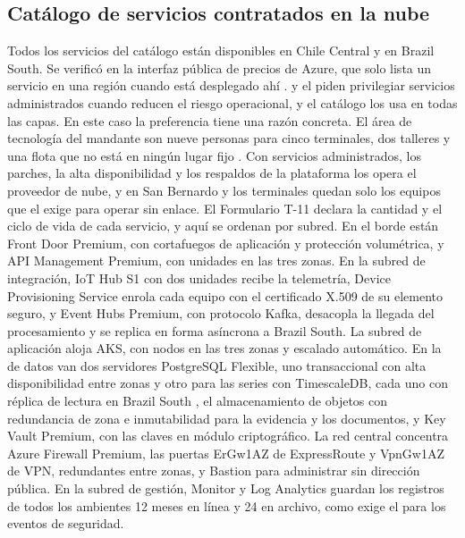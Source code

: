 \subsection{Catálogo de servicios contratados en la nube}\label{sec:4-catalogo}

Todos los servicios del catálogo están disponibles en Chile Central y en Brazil South. Se verificó en
la interfaz pública de precios de Azure, que solo lista un servicio en una región cuando está
desplegado ahí \parencite{ms_precios_api}.  y el  piden privilegiar
servicios administrados cuando reducen el riesgo operacional, y el catálogo los usa en todas las capas.
En este caso la preferencia tiene una razón concreta. El área de tecnología del mandante son nueve
personas para cinco terminales, dos talleres y una flota que no está en ningún lugar fijo
. Con servicios administrados, los parches, la alta disponibilidad y los
respaldos de la plataforma los opera el proveedor de nube, y en San Bernardo y los terminales quedan
solo los equipos que el  exige para operar sin enlace. El Formulario T-11 declara
la cantidad y el ciclo de vida de cada servicio, y aquí se ordenan por subred. En el borde están Front
Door Premium, con cortafuegos de aplicación y protección volumétrica, y API Management Premium, con
unidades en las tres zonas. En la subred de integración, IoT Hub S1 con dos unidades recibe la
telemetría, Device Provisioning Service enrola cada equipo con el certificado X.509 de su elemento
seguro, y Event Hubs Premium, con protocolo Kafka, desacopla la llegada del procesamiento y se replica
en forma asíncrona a Brazil South. La subred de aplicación aloja AKS, con nodos en las tres zonas y
escalado automático. En la de datos van dos servidores PostgreSQL Flexible, uno transaccional con alta
disponibilidad entre zonas y otro para las series con TimescaleDB, cada uno con réplica de lectura en
Brazil South \parencite{ms_pg_overview}, el almacenamiento de objetos con redundancia de zona e
inmutabilidad para la evidencia y los documentos, y Key Vault Premium, con las claves en módulo
criptográfico. La red central concentra Azure Firewall Premium, las puertas ErGw1AZ de ExpressRoute y
VpnGw1AZ de VPN, redundantes entre zonas, y Bastion para administrar sin dirección pública. En la
subred de gestión, Monitor y Log Analytics guardan los registros de todos los ambientes 12 meses en
línea y 24 en archivo, como exige el  para los eventos de seguridad.

